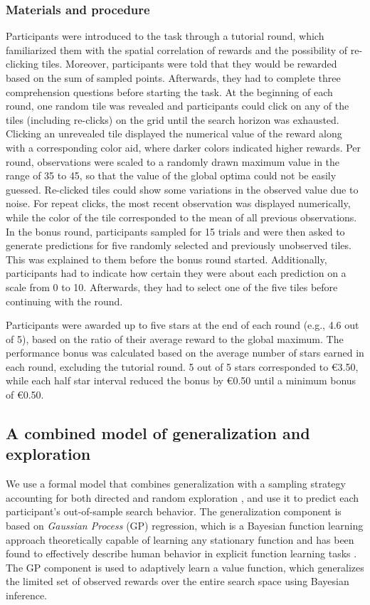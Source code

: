 \documentclass[a4paper,man, floatsintext, natbib]{apa6}
\begin{document}
\subsubsection*{Materials and procedure} 
Participants were introduced to the task through a tutorial round, which familiarized them with the spatial correlation of rewards and the possibility of re-clicking tiles. Moreover, participants were told that they would be rewarded based on the sum of sampled points. Afterwards, they had to complete three comprehension questions before starting the task. At the beginning of each round, one random tile was revealed and participants could click on any of the tiles (including re-clicks) on the grid until the search horizon was exhausted. Clicking an unrevealed tile displayed the numerical value of the reward along with a corresponding color aid, where darker colors indicated higher rewards. Per round, observations were scaled to a randomly drawn maximum value in the range of 35 to 45, so that the value of the global optima could not be easily guessed. Re-clicked tiles could show some variations in the observed value due to noise. For repeat clicks, the most recent observation was displayed numerically, while the color of the tile corresponded to the mean of all previous observations. In the bonus round, participants sampled for 15 trials and were then asked to generate predictions for five randomly selected and previously unobserved tiles. This was explained to them before the bonus round started. Additionally, participants had to indicate how certain they were about each prediction on a scale from 0 to 10. Afterwards, they had to select one of the five tiles before continuing with the round.

Participants were awarded up to five stars at the end of each round (e.g., 4.6 out of 5), based on the ratio of their average reward to the global maximum. The performance bonus was calculated based on the average number of stars earned in each round, excluding the tutorial round. 5 out of 5 stars corresponded to \euro 3.50, while each half star interval reduced the bonus by \euro 0.50 until a minimum bonus of \euro 0.50.


\subsection*{A combined model of generalization and exploration}
We use a formal model that combines generalization with a sampling strategy accounting for both directed and random exploration \citep{wu2018exploration}, and use it to predict each participant's out-of-sample search behavior. The generalization component is based on \emph{Gaussian Process} (GP) regression, which is a Bayesian function learning approach theoretically capable of learning any stationary function \citep{williams2006gaussian} and has been found to effectively describe human behavior in explicit function learning tasks \citep{lucas2015rational}. The GP component is used to adaptively learn a value function, which generalizes the limited set of observed rewards over the entire search space using Bayesian inference.
\end{document}
